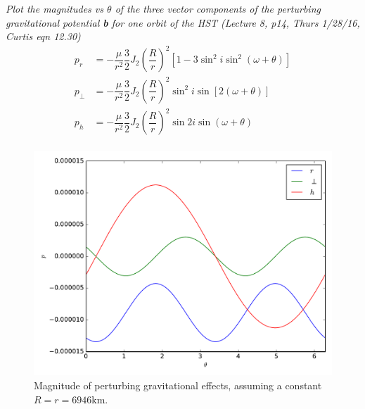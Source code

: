 \documentclass[onecolumn,10pt]{jhwhw}
\begin{document}
\clearpage
\problem{}
\textit{Plot the magnitudes vs $\theta$ of the three vector components of the perturbing gravitational potential \textbf{b} for one orbit of the HST (Lecture 8, p14, Thurs 1/28/16, Curtis eqn 12.30)}
\begin{align*}
p_r &= - \dfrac{\mu}{r^2} \dfrac{3}{2} J_2 \left( \dfrac{R}{r} \right)^2 \left[ 1 - 3 \sin^2 i \sin^2 (\omega + \theta) \right] \\
p_{\bot} &= - \dfrac{\mu}{r^2} \dfrac{3}{2} J_2 \left( \dfrac{R}{r} \right)^2 \sin^2 i \sin [2(\omega + \theta)] \\
p_h &= - \dfrac{\mu}{r^2} \dfrac{3}{2} J_2 \left( \dfrac{R}{r} \right)^2 \sin 2i \sin (\omega + \theta) \\
\end{align*}
\begin{figure}[tbh!]
\begin{center}
\includegraphics[height=0.55\textheight]{p4.pdf}
\end{center}
\caption{Magnitude of perturbing gravitational effects, assuming a constant $R=r=6946$km.}
\end{figure}
\end{document}
